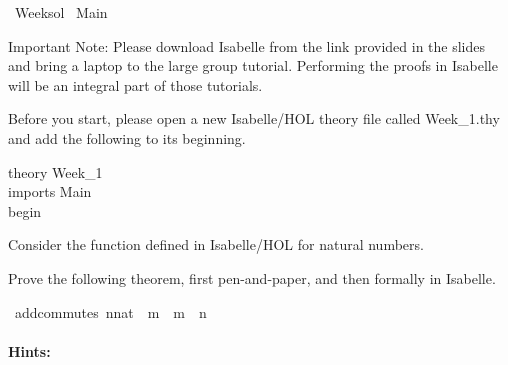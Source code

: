 %
\begin{isabellebody}%
%
%
\isadelimtheory
\isanewline
%
\endisadelimtheory
%
\isatagtheory
{}\isamarkupfalse%
\ Week{\isacharunderscore}{\kern0pt}{}{\isacharunderscore}{\kern0pt}sol\isanewline
{}\ Main\isanewline
{}%
\endisatagtheory
{\isafoldtheory}%
%
\isadelimtheory
%
\endisadelimtheory
%
\begin{isamarkuptext}%
\vspace{15ex}%
\end{isamarkuptext}\isamarkuptrue%
%
\begin{isamarkuptext}%
Important Note: Please download Isabelle from the link provided in the slides and bring a 
      laptop to the large group tutorial. Performing the proofs in Isabelle will be an integral part
      of those tutorials.%
\end{isamarkuptext}\isamarkuptrue%
%
\begin{isamarkuptext}%
Before you start, please open a new Isabelle/HOL theory file called Week\_1.thy and add the
       following to its beginning.

\noindent theory Week\_1\\
imports Main\\
begin%
\end{isamarkuptext}\isamarkuptrue%
%
\begin{isamarkuptext}%
%
\end{isamarkuptext}\isamarkuptrue%
%
\begin{isamarkuptext}%
Consider the function \isa{{\isacharparenleft}{\kern0pt}{\isacharplus}{\kern0pt}{\isacharparenright}{\kern0pt}} defined in Isabelle/HOL for natural numbers.

Prove the following theorem, first pen-and-paper, and then formally in Isabelle.%
\end{isamarkuptext}\isamarkuptrue%
\isamarkupfalse%
\ add{\isacharunderscore}{\kern0pt}commutes{\isacharcolon}{\kern0pt}\ {\isachardoublequoteopen}{\isacharparenleft}{\kern0pt}n{\isacharcolon}{\kern0pt}{\isacharcolon}{\kern0pt}nat{\isacharparenright}{\kern0pt}\ {\isacharplus}{\kern0pt}\ m\ {\isacharequal}{\kern0pt}\ m\ {\isacharplus}{\kern0pt}\ n{\isachardoublequoteclose}%
\begin{isamarkuptext}%
\paragraph{Hints:} 


\end{isamarkuptext}
\end{isabellebody}
